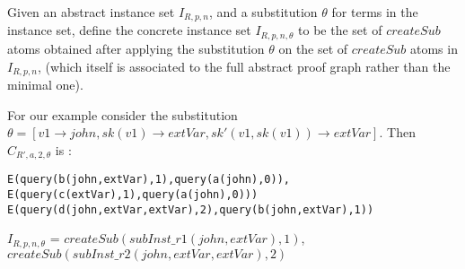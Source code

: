 \begin{definition}
Given an abstract instance set $I_{R,p,n}$, and a substitution $\theta$ for
terms in the instance set, define the concrete instance set
$I_{R,p,n,\theta}$ to be the set of $createSub$ atoms obtained after applying the
substitution $\theta$ on the set of $createSub$ atoms in $I_{R,p,n}$, (which itself is associated to the full abstract proof graph rather than the minimal one).
\end{definition}
For our example consider the substitution $\theta =[v1\rightarrow john,sk(v1) \rightarrow extVar, sk'(v1,sk(v1))\rightarrow extVar]$. Then $C_{R',a,2,\theta}$ is :
\begin{lstlisting}[frame=none]
E(query(b(john,extVar),1),query(a(john),0)),
E(query(c(extVar),1),query(a(john),0)))
E(query(d(john,extVar,extVar),2),query(b(john,extVar),1))
\end{lstlisting}
$I_{R,p,n,\theta}$ = $createSub(subInst\_r1(john,extVar),1)$,\\ $createSub(subInst\_r2(john,extVar, extVar),2)$

